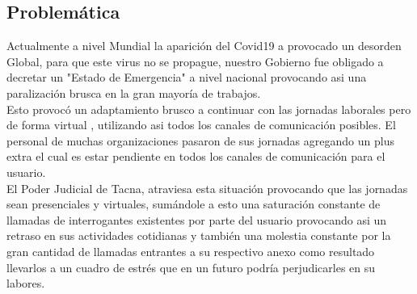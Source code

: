 \documentclass[twoside,twocolumn]{article}
\begin{document}
\subsection{Problemática}
Actualmente a nivel Mundial la aparición del Covid19 a provocado un desorden Global, para que este virus no se propague, nuestro Gobierno fue obligado a decretar un "Estado de Emergencia" a nivel nacional provocando asi una paralización brusca en la gran mayoría de trabajos.
\\
Esto provocó un adaptamiento brusco a continuar con las jornadas laborales pero de forma virtual , utilizando asi todos los canales de comunicación posibles.
El personal de muchas organizaciones pasaron de sus jornadas agregando un plus extra el cual es estar pendiente en todos los canales de comunicación para el usuario.
\\
El Poder Judicial de Tacna, atraviesa esta situación provocando que las jornadas sean presenciales y virtuales, sumándole a esto una saturación constante de llamadas de   interrogantes existentes por parte del usuario provocando asi un retraso en sus actividades cotidianas y también una molestia constante por la gran cantidad de llamadas entrantes a su respectivo anexo como resultado llevarlos a un cuadro de estrés que en un futuro podría perjudicarles en su labores.
\end{document}

